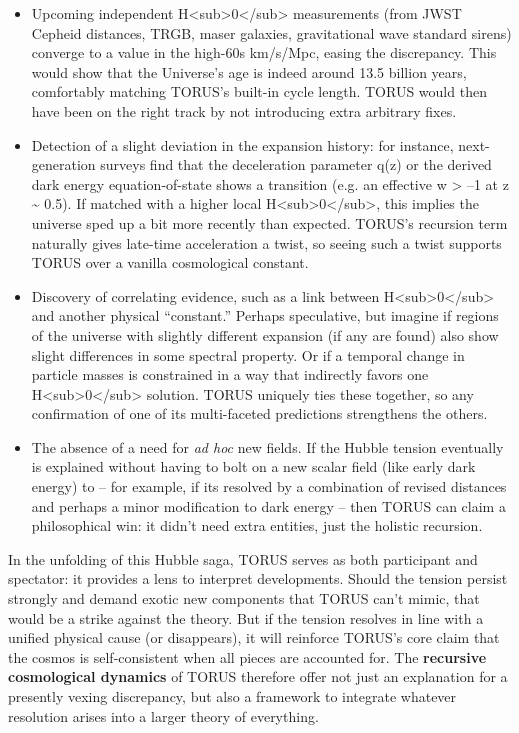 \documentclass[
]{article}
\begin{document}
\begin{itemize}
\item
  Upcoming independent
  H\textless sub\textgreater0\textless/sub\textgreater{} measurements
  (from JWST Cepheid distances, TRGB, maser galaxies, gravitational wave
  standard sirens) converge to a value in the high-60s km/s/Mpc, easing
  the discrepancy. This would show that the Universe's age is indeed
  around 13.5 billion years, comfortably matching TORUS's built-in cycle
  length. TORUS would then have been on the right track by not
  introducing extra arbitrary fixes.
\item
  Detection of a slight deviation in the expansion history: for
  instance, next-generation surveys find that the deceleration parameter
  q(z) or the derived dark energy equation-of-state shows a transition
  (e.g. an effective w \textgreater{} --1 at z \textasciitilde{} 0.5).
  If matched with a higher local
  H\textless sub\textgreater0\textless/sub\textgreater, this implies the
  universe sped up a bit more recently than expected. TORUS's recursion
  term naturally gives late-time acceleration a twist, so seeing such a
  twist supports TORUS over a vanilla cosmological constant.
\item
  Discovery of correlating evidence, such as a link between
  H\textless sub\textgreater0\textless/sub\textgreater{} and another
  physical ``constant.'' Perhaps speculative, but imagine if regions of
  the universe with slightly different expansion (if any are found) also
  show slight differences in some spectral property. Or if a temporal
  change in particle masses is constrained in a way that indirectly
  favors one H\textless sub\textgreater0\textless/sub\textgreater{}
  solution. TORUS uniquely ties these together, so any confirmation of
  one of its multi-faceted predictions strengthens the others.
\item
  The absence of a need for \emph{ad hoc} new fields. If the Hubble
  tension eventually is explained without having to bolt on a new scalar
  field (like early dark energy) to \LambdaCDM -- for example, if
  it\textquotesingle s resolved by a combination of revised distances
  and perhaps a minor modification to dark energy -- then TORUS can
  claim a philosophical win: it didn't need extra entities, just the
  holistic recursion.
\end{itemize}

In the unfolding of this Hubble saga, TORUS serves as both participant
and spectator: it provides a lens to interpret developments. Should the
tension persist strongly and demand exotic new components that TORUS
can't mimic, that would be a strike against the theory. But if the
tension resolves in line with a unified physical cause (or disappears),
it will reinforce TORUS's core claim that the cosmos is self-consistent
when all pieces are accounted for. The \textbf{recursive cosmological
dynamics} of TORUS therefore offer not just an explanation for a
presently vexing discrepancy, but also a framework to integrate whatever
resolution arises into a larger theory of everything.
\end{document}
